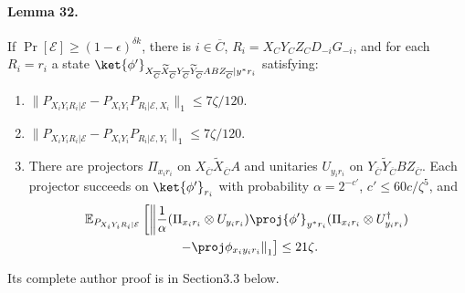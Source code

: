 \paragraph{Lemma 32.} If $\Pr[\mathcal E]\ge(1-\epsilon)^{\delta k}$, there is $i\in\overline C$, $R_i=X_CY_CZ_CD_{-i}G_{-i}$, and for each $R_i=r_i$ a state $\ket{\phi'}_{X_{\overline C}\widetilde X_{\overline C}Y_{\overline C}\widetilde Y_{\overline C}ABZ_{\overline C}|y^*r_i}$ satisfying:
\begin{enumerate}\item[(i)] $\|P_{X_iY_iR_i|\mathcal E}-P_{X_iY_i}P_{R_i|\mathcal E,X_i}\|_1\le7\zeta/120$.
\item[(ii)] $\|P_{X_iY_iR_i|\mathcal E}-P_{X_iY_i}P_{R_i|\mathcal E,Y_i}\|_1\le7\zeta/120$.
\item[(iii)] There are projectors $\Pi_{x_ir_i}$ on $X_{\overline C}\widetilde X_{\overline C}A$ and unitaries $U_{y_ir_i}$ on $Y_{\overline C}\widetilde Y_{\overline C}BZ_{\overline C}$. Each projector succeeds on $\ket{\phi'}_{r_i}$ with probability $\alpha=2^{-c'}$, $c'\le60c/\zeta^5$, and
\begin{multline*}\mathbb E_{P_{X_iY_iR_i|\mathcal E}}\left[\left\|\frac1\alpha(\Pi_{x_ir_i}\otimes U_{y_ir_i})\proj{\phi'}_{y^*r_i}(\Pi_{x_ir_i}\otimes U_{y_ir_i}^\dagger)\right.\right.\\\left.\left.-\proj\phi_{x_iy_ir_i}\right\|_1\right]\le21\zeta.
\end{multline*}\end{enumerate}
Its complete author proof is in Section3.3 below.

